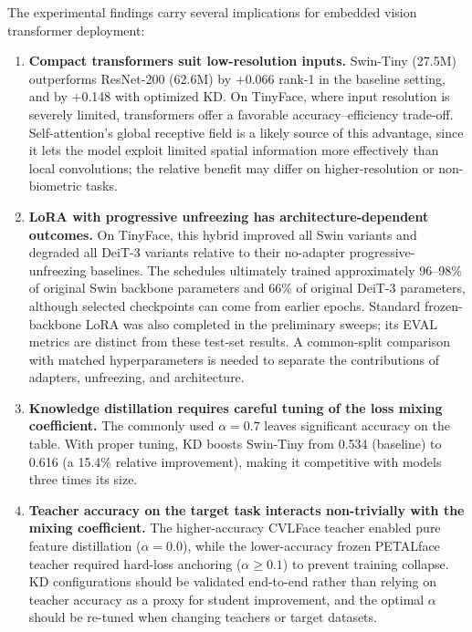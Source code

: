 \documentclass[runningheads,a4paper]{llncs}
\begin{document}
The experimental findings carry several implications for embedded vision transformer deployment:

\begin{enumerate}
    \item \textbf{Compact transformers suit low-resolution inputs.} Swin-Tiny (27.5M) outperforms ResNet-200 (62.6M) by $+$0.066 rank-1 in the baseline setting, and by $+$0.148 with optimized KD. On TinyFace, where input resolution is severely limited, transformers offer a favorable accuracy--efficiency trade-off. Self-attention's global receptive field is a likely source of this advantage, since it lets the model exploit limited spatial information more effectively than local convolutions; the relative benefit may differ on higher-resolution or non-biometric tasks.

    \item \textbf{LoRA with progressive unfreezing has architecture-dependent outcomes.} On TinyFace, this hybrid improved all Swin variants and degraded all DeiT-3 variants relative to their no-adapter progressive-unfreezing baselines. The schedules ultimately trained approximately 96--98\% of original Swin backbone parameters and 66\% of original DeiT-3 parameters, although selected checkpoints can come from earlier epochs. Standard frozen-backbone LoRA was also completed in the preliminary sweeps; its EVAL metrics are distinct from these test-set results. A common-split comparison with matched hyperparameters is needed to separate the contributions of adapters, unfreezing, and architecture.

    \item \textbf{Knowledge distillation requires careful tuning of the loss mixing coefficient.} The commonly used $\alpha = 0.7$ leaves significant accuracy on the table. With proper tuning, KD boosts Swin-Tiny from 0.534 (baseline) to 0.616 (a 15.4\% relative improvement), making it competitive with models three times its size.

    \item \textbf{Teacher accuracy on the target task interacts non-trivially with the mixing coefficient.} The higher-accuracy CVLFace teacher enabled pure feature distillation ($\alpha = 0.0$), while the lower-accuracy frozen PETALface teacher required hard-loss anchoring ($\alpha \geq 0.1$) to prevent training collapse. KD configurations should be validated end-to-end rather than relying on teacher accuracy as a proxy for student improvement, and the optimal $\alpha$ should be re-tuned when changing teachers or target datasets.


\end{enumerate}
\end{document}

